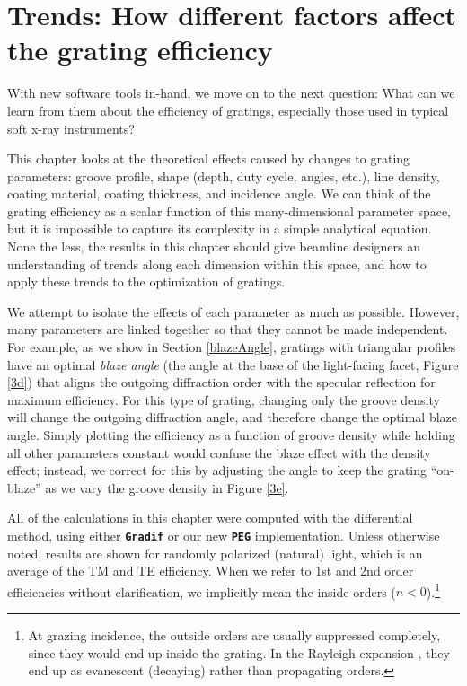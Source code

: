 \chapter{Trends: How different factors affect the grating efficiency}
With new software tools in-hand, we move on to the next question: What can we learn from them about the efficiency of gratings, especially those used in typical soft x-ray instruments?

This chapter looks at the theoretical effects caused by changes to grating parameters: groove profile, shape (depth, duty cycle, angles, etc.), line density, coating material, coating thickness, and incidence angle.  We can think of the grating efficiency as a scalar function of this many-dimensional parameter space, but it is impossible to capture its complexity in a simple analytical equation.  None the less, the results in this chapter should give beamline designers an understanding of trends along each dimension within this space, and how to apply these trends to the optimization of gratings.

We attempt to isolate the effects of each parameter as much as possible.  However, many parameters are linked together so that they cannot be made independent.  For example, as we show in Section \ref{blazeAngle}, gratings with triangular profiles have an optimal \emph{blaze angle} (the angle at the base of the light-facing facet, Figure \ref{3d}) that aligns the outgoing diffraction order with the specular reflection for maximum efficiency.  For this type of grating, changing only the groove density will change the outgoing diffraction angle, and therefore change the optimal blaze angle.  Simply plotting the efficiency as a function of groove density while holding all other parameters constant would confuse the blaze effect with the density effect; instead, we correct for this by adjusting the angle to keep the grating ``on-blaze'' as we vary the groove density in Figure \ref{3e}.

All of the calculations in this chapter were computed with the differential method, using either \texttt{\textbf{Gradif}} or our new \texttt{\textbf{PEG}} implementation.  Unless otherwise noted, results are shown for randomly polarized (natural) light, which is an average of the TM and TE efficiency.  When we refer to 1st and 2nd order efficiencies without clarification, we implicitly mean the inside orders ($n<0$).\footnote{At grazing incidence, the outside orders are usually suppressed completely, since they would end up inside the grating. In the Rayleigh expansion , they end up as evanescent (decaying) rather than propagating orders.}
